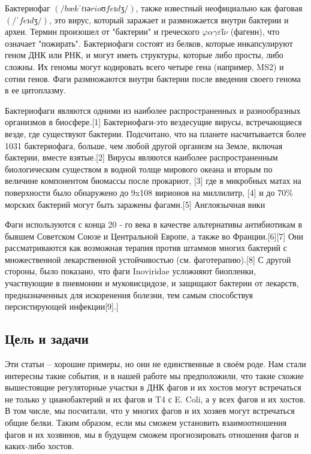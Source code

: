 \documentclass[a4paper,12pt]{article}
\begin{document}
	\par{Бактериофаг $(/bækˈtɪərioʊfeɪdʒ/)$, также известный неофициально как фаговая \((/ˈfeɪdʒ/)\), это вирус, который
	заражает и размножается внутри бактерии и археи. Термин произошел от "бактерии" и греческого $φαγεῖν$ (фагеин), что
	означает "пожирать". Бактериофаги состоят из белков, которые инкапсулируют геном ДНК или РНК, и могут иметь
	структуры, которые либо просты, либо сложны. Их геномы могут кодировать всего четыре гена (например, MS2) и сотни
	генов. Фаги размножаются внутри бактерии после введения своего генома в ее цитоплазму.}
	
	\par{Бактериофаги являются одними из наиболее распространенных и разнообразных организмов в биосфере.[1]
	Бактериофаги-это вездесущие вирусы, встречающиеся везде, где существуют бактерии. Подсчитано, что на планете
	насчитывается более 1031 бактериофага, больше, чем любой другой организм на Земле, включая бактерии, вместе
	взятые.[2] Вирусы являются наиболее распространенным биологическим существом в водной толще мирового океана и вторым
	по величине компонентом биомассы после прокариот, [3] где в микробных матах на поверхности было обнаружено до 9x108
	вирионов на миллилитр, [4] и до 70\% морских бактерий могут быть заражены фагами.[5] Англоязычная вики}

    \par{Фаги используются с конца 20 - го века в качестве альтернативы антибиотикам в бывшем Советском Союзе и
    Центральной Европе, а также во Франции.[6][7] Они рассматриваются как возможная терапия против штаммов многих
    бактерий с множественной лекарственной устойчивостью (см. фаготерапию).[8] С другой стороны, было показано, что фаги
    Inoviridae усложняют биопленки, участвующие в пневмонии и муковисцидозе, и защищают бактерии от лекарств,
    предназначенных для искоренения болезни, тем самым способствуя персистирующей инфекции[9].]}
\newpage
\begin{center}
\section{Цель и задачи} \label{sec:code}
\end{center}

\par{Эти статьи – хорошие примеры, но они не единственные в своём роде. Нам стали интересны такие события, и в нашей
    работе мы предположили, что такие схожие вышестоящие регуляторные участки в ДНК фагов и их хостов могут встречаться
    не только у цианобактерий и их фагов и T4 с E. Coli, а у всех фагов и их хостов. В том числе, мы посчитали, что у
    многих фагов и их хозяев могут встречаться общие белки. Таким образом, если мы сможем установить взаимоотношения
    фагов и их хозяинов, мы в будущем сможем прогнозировать отношения фагов и каких-либо хостов.}
\end{document}
